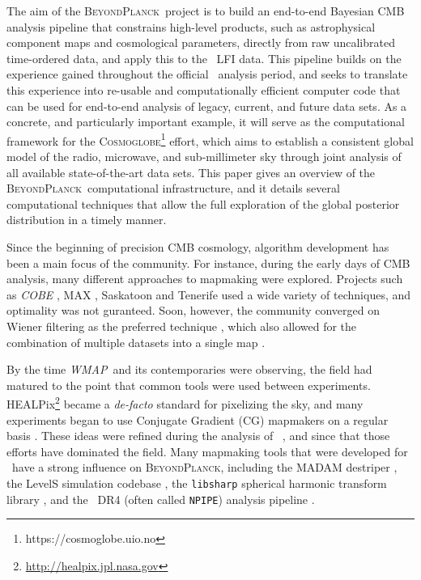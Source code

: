 \documentclass[twocolumn]{aa}
\def\WMAP{\emph{WMAP}}
\newcommand{\BP}{\textsc{BeyondPlanck}}
\newcommand{\npipe}[0]{\texttt{NPIPE}}
\begin{document}
The aim of the \BP\ project \citep{BP01} is to build an end-to-end
Bayesian CMB analysis pipeline that constrains high-level products,
such as astrophysical component maps and cosmological parameters,
directly from raw uncalibrated time-ordered data, and apply this to
the \Planck\ LFI data. This pipeline builds on the experience gained
throughout the official \Planck\ analysis period, and seeks to
translate this experience into re-usable and computationally efficient
computer code that can be used for end-to-end analysis of legacy,
current, and future data sets. As a concrete, and particularly
important example, it will serve as the computational framework for
the \textsc{Cosmoglobe}\footnote{https://cosmoglobe.uio.no} effort,
which aims to establish a consistent global model of the radio,
microwave, and sub-millimeter sky through joint analysis of all
available state-of-the-art data sets. This paper gives an overview of
the \BP\ computational infrastructure, and it details several
computational techniques that allow the full exploration of the global
posterior distribution in a timely manner.

Since the beginning of precision CMB cosmology, algorithm development
has been a main focus of the community. For instance, during the early
days of CMB analysis, many different approaches to mapmaking were
explored. Projects such as \emph{COBE} \citep{cobe1,cobe2}, MAX
\citep{max}, Saskatoon \citep{saskatoon} and Tenerife \citep{tenerife}
used a wide variety of techniques, and optimality was not
guranteed. Soon, however, the community converged on Wiener filtering
as the preferred technique \citep{tegmark}, which also allowed for the
combination of multiple datasets into a single map
\citep{CobeCombined}.

By the time \WMAP\ and its contemporaries were observing, the field
had matured to the point that common tools were used between
experiments. HEALPix\footnote{\url{http://healpix.jpl.nasa.gov}} \citep{healpix} became a \emph{de-facto} standard
for pixelizing the sky, and many experiments began to use Conjugate
Gradient (CG) mapmakers on a regular basis \cite[e.g.,][]{wmap}. These
ideas were refined during the analysis of
\Planck\ \citep{planck2013-p01,planck2014-a01,planck2016-l01}, and
since that those efforts have dominated the field. Many mapmaking
tools that were developed for \Planck\ have a strong
influence on \BP, including the MADAM destriper \citep{madam}, the
LevelS simulation codebase \citep{LevelS}, the \texttt{libsharp} spherical
harmonic transform library \citep{libsharp}, and the \Planck\ DR4
(often called \npipe) analysis
pipeline \cite{npipe}.
\end{document}

